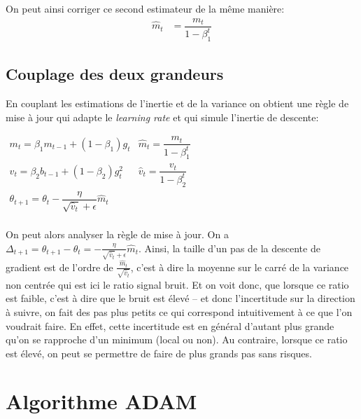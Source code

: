 \documentclass[fleqn,11pt, titlepage, french]{article}
\begin{document}
	On peut ainsi corriger ce second estimateur de la même manière:
	\begin{align*}
		\hat{m}_t &= \dfrac{m_t}{1 - \beta^t_1}
	\end{align*}
	
	\subsection{Couplage des deux grandeurs}
	
	En couplant les estimations de l'inertie et de la variance on obtient une règle de mise à jour qui adapte le \emph{learning rate} et qui simule l'inertie de descente:
	\begin{center}
	$
		\begin{array}{ll}
		m_t = \beta_1 m_{t-1} + (1-\beta_1) g_t & \hat{m}_t = \dfrac{m_t}{1 - \beta^t_1} \\
		v_t = \beta_2 b_{t-1} +  (1-\beta_2)g_t^2 & \hat{v}_t = \dfrac{v_t}{1 - \beta^t_2} \\
		
		\theta_{t+1} = \theta_{t} - \dfrac{\eta}{\sqrt{\hat{v}_t} + \epsilon} \hat{m}_t & \\
		\end{array}
	$
	\end{center}

	On peut alors analyser la règle de mise à jour. On a $\Delta_{t+1} = \theta_{t+1} - \theta_{t} = - \frac{\eta}{\sqrt{\hat{v}_t} + \epsilon} \hat{m}_t$. Ainsi, la taille d'un pas de la descente de gradient est de l'ordre de $\frac{\hat{m}_t}{\sqrt{\hat{v}_t}}$, c'est à dire la moyenne sur le carré de la variance non centrée qui est ici le ratio signal bruit. Et on voit donc, que lorsque ce ratio est faible, c'est à dire que le bruit est élevé -- et donc l'incertitude sur la direction à suivre, on fait des pas plus petits ce qui correspond intuitivement à ce que l'on voudrait faire. En effet, cette incertitude est en général d'autant plus grande qu'on se rapproche d'un minimum (local ou non). Au contraire, lorsque ce ratio est élevé, on peut se permettre de faire de plus grands pas sans risques.
	
	
	
	
	\section{Algorithme ADAM}
\end{document}
